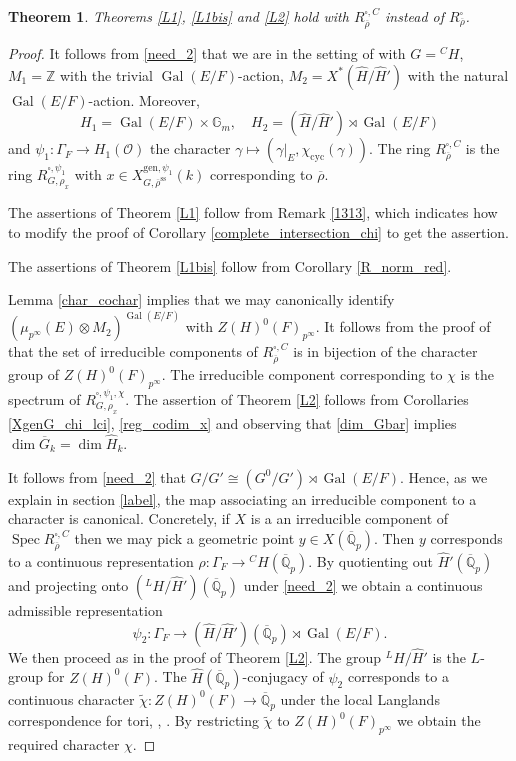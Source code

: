 \documentclass{amsart}
\newtheorem{thm}[prop]{Theorem}
\theoremstyle{definition}
\theoremstyle{remark}
\DeclareMathOperator{\Gal}{Gal}
\DeclareMathOperator{\Spec}{Spec}
\newcommand{\Qpbar}{\overline{\mathbb{Q}}_p}
\newcommand{\ZZ}{\mathbb Z}
\newcommand{\OO}{\mathcal O}
\newcommand{\rhobar}{\overline{\rho}}
\newcommand{\Gm}{\mathbb G_{m}}
\newcommand{\gen}{\mathrm{gen}}
\newcommand{\cyc}{\mathrm{cyc}}
\newcommand{\rhobarss}{\rhobar^{\mathrm{ss}}}
\newcommand{\Gbar}{\overline{G}}
\begin{document}
\begin{thm}\label{C} Theorems \ref{L1}, \ref{L1bis} and \ref{L2} hold with $R^{\square, C}_{\rhobar}$
instead of $R^{\square}_{\rhobar}$.
\end{thm}
\begin{proof} It follows from \eqref{need_2} that we are in the setting of  with $G={}^C H$, $M_1=\ZZ$ with the trivial $\Gal(E/F)$-action, 
$M_2=X^{\ast}(\widehat{H}/\widehat{H}')$ with the natural $\Gal(E/F)$-action. 
Moreover, 
$$H_1= \Gal(E/F)\times \Gm, \quad  H_2= (\widehat{H}/\widehat{H}')\rtimes \Gal(E/F)$$
and $\psi_1: \Gamma_F \rightarrow H_1(\OO)$ the character 
$\gamma\mapsto (\gamma|_E, \chi_{\cyc}(\gamma))$. 
The ring $R^{\square, C}_{\rhobar}$ is the ring $R^{\square, \psi_1}_{G, \rho_x}$ 
with $x\in X^{\gen, \psi_1}_{G, \rhobarss}(k)$ corresponding to $\rhobar$. 

The assertions of Theorem \ref{L1} follow from Remark \ref{1313}, which indicates
how to modify the proof of Corollary \ref{complete_intersection_chi} to get the 
assertion. 

The assertions of Theorem \ref{L1bis} follow from Corollary \ref{R_norm_red}.

Lemma \ref{char_cochar} implies
that we may canonically identify $(\mu_{p^{\infty}}(E)\otimes M_2)^{\Gal(E/F)}$
with $Z(H)^0(F)_{p^{\infty}}$. It follows from the proof of  
 that the set of irreducible components of $R^{\square, C}_{\rhobar}$ is in bijection of the character group of $Z(H)^0(F)_{p^{\infty}}$. 
The irreducible component corresponding to $\chi$ is the spectrum 
of $R^{\square, \psi_1, \chi}_{G, \rho_x}$. The assertion of Theorem \ref{L2}
follows from Corollaries \ref{XgenG_chi_lci}, \ref{reg_codim_x} and observing 
that \eqref{dim_Gbar} implies $\dim \Gbar_k= \dim \widehat{H}_k$. 

It follows from \eqref{need_2} that $G/G'\cong (G^0/G')\rtimes \Gal(E/F)$.
Hence,  as we explain in section \ref{label}, the map associating an irreducible component to a character is canonical. Concretely, if $X$ is a an irreducible 
component of $\Spec R^{\square, C}_{\rhobar}$ then we may pick 
a geometric point $y\in X(\Qpbar)$. Then $y$ corresponds 
to a continuous representation $\rho: \Gamma_F \rightarrow {}^C H(\Qpbar)$. 
By quotienting out $\widehat{H}'(\Qpbar)$ and projecting onto 
$({}^L H/ \widehat{H}')(\Qpbar)$ under \eqref{need_2} we obtain a continuous 
admissible representation 
$$\psi_2: \Gamma_F \rightarrow (\widehat{H}/\widehat{H}')(\Qpbar)\rtimes \Gal(E/F).$$
We then proceed as in the proof of Theorem \ref{L2}. The group ${}^LH/\widehat{H}'$ is the $L$-group for $Z(H)^0(F)$. 
The  $\widehat{H}(\Qpbar)$-conjugacy of $\psi_2$ corresponds to a continuous character $\tilde{\chi}: Z(H)^0(F)\rightarrow \Qpbar$ under the local Langlands
correspondence for tori, \cite{langlands_tori}, \cite{birkbeck}.  By restricting 
$\tilde{\chi}$ to $Z(H)^0(F)_{p^{\infty}}$ we obtain the required character $\chi$. 
\end{proof}
\end{document}
